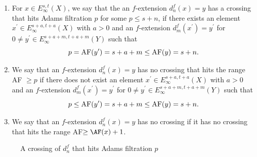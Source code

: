 \begin{definition} \label{def:crossing}
\begin{enumerate}
    \item For $x\in E_\infty^{s,t}(X)$, we say that the an $f$-extension $d_n^{f}(x)=y$ has a crossing that hits Adams filtration $p$ for some $p \leq s+n$, if there exists an element $x^\prime\in E_\infty^{s+a,t+a}(X)$ with $a>0$ and an $f$-extension $d_m^{f}(x^\prime)=y^\prime$ for $0\neq y^\prime\in E^{s+a+m, t+a+m}_\infty(Y)$ such that
    $$p = \textup{AF}(y^\prime) = s+a+m\le \textup{AF}(y) = s+n.$$
    \item We say that an $f$-extension $d_n^{f}(x)=y$ has no crossing that hits the range AF $\ge p$ if there does not exist an element $x^\prime\in E_\infty^{s+a,t+a}(X)$ with $a>0$ and an $f$-extension $d_m^{f}(x^\prime)=y^\prime$ for $0\neq y^\prime\in E^{s+a+m, t+a+m}_\infty(Y)$ such that
    $$p\le \textup{AF}(y^\prime) = s+a+m\le \textup{AF}(y) = s+n.$$
    \item We say that an $f$-extension $d_n^{f}(x)=y$ has no crossing if it has no crossing that hits the range AF$\ge \AF(x) + 1$.
\end{enumerate}
\end{definition}


\begin{figure}[h]
\centering
{}
\caption{A crossing of $d_n^f$ that hits Adams filtration $p$}
\end{figure}
   
